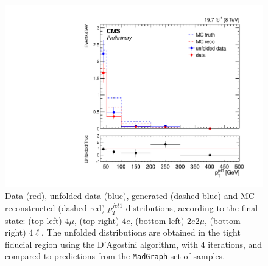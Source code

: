 \begin{figure}[hbtp]
\begin{center}
    \includegraphics[width=\cmsFigWidth]{Figures/PtJet1_ZZTo4l_Mad_fr}       
    \caption{\footnotesize{Data (red), unfolded data (blue), generated (dashed blue) and MC reconstructed (dashed red) $p_{T}^{jet1}$ distributions, according to the final state: (top left) $4\mu$, (top right) $4e$, (bottom left) $2e2\mu$, (bottom right) $4\ell$. The unfolded distributions are obtained in the tight fiducial region using the D'Agostini algorithm, with 4 iterations, and compared to predictions from the \texttt{MadGraph} set of samples.}} 
    \label{fig:PtJet1_unfolding}
  \end{center}
\end{figure}

